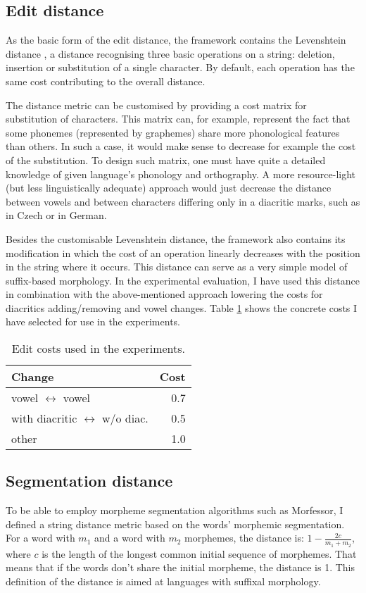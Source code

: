 \subsection{Edit distance}
As the basic form of the edit distance, the framework contains the Levenshtein distance \citep{levenshtein66}, a distance recognising three basic operations on a string: deletion, insertion or substitution of a single character. By default, each operation has the same cost contributing to the overall distance. 

The distance metric can be customised by providing a cost matrix for substitution of characters. This matrix can, for example, represent the fact that some phonemes (represented by graphemes) share more phonological features than others. In such a case, it would make sense to decrease for example the cost of the  substitution. To design such matrix, one must have quite a detailed knowledge of given language's phonology and orthography. A more resource-light (but less linguistically adequate) approach would just decrease the distance between vowels and between characters differing only in a diacritic marks, such as  in Czech or  in German.

Besides the customisable Levenshtein distance, the framework also contains its modification in which the cost of an operation linearly decreases with the position in the string where it occurs. This distance can serve as a very simple model of suffix-based morphology. 
In the experimental evaluation, I have used this distance in combination with the above-mentioned approach lowering the costs for diacritics adding/removing and vowel changes. Table \ref{table:edit_config} shows the concrete costs I have selected for use in the experiments.

\begin{table}[h]
\centering
\begin{tabular}{lr}
\toprule
\bf Change & \bf Cost\\
\midrule
vowel $ \leftrightarrow $ vowel 				& 0.7\\
with diacritic $ \leftrightarrow $ w/o diac.    & 0.5\\
other & 1.0\\
\bottomrule
\end{tabular}
\caption{\label{table:edit_config} Edit costs used in the experiments.}
\end{table}

\subsection{Segmentation distance}
To be able to employ morpheme segmentation algorithms such as Morfessor, I defined a string distance metric based on the words' morphemic segmentation. For a word with $m_1$ and a word with $m_2$ morphemes, the distance is: $1 - \frac{2c}{m_1 + m_2}$, where $c$ is the length of the longest common initial sequence of morphemes. That means that if the words don't share the initial morpheme, the distance is 1. This definition of the distance is aimed at languages with suffixal morphology.

